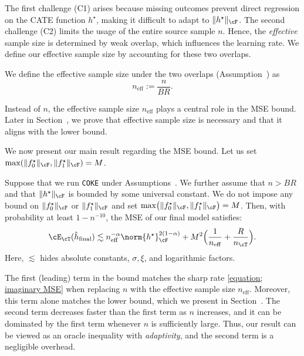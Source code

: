 \documentclass[12pt,a4paper,pdftex,onepage]{article}
\newcommand{\final}{\operatorname{final}}
\begin{document}
The first challenge (C1) arises because missing outcomes prevent direct regression on the CATE function \(h^\star\), making it difficult to adapt to \(\|h^\star\|_\cF\). 
The second challenge (C2) limits the usage of the entire source sample \(n\). 
Hence, the \emph{effective} sample size is determined by weak overlap, which influences the learning rate.
We define our effective sample size by accounting for these two overlaps. 
\begin{definition}
We define the effective sample size under the two overlaps (Assumption~) as 
\[
n_{\operatorname{eff}}:= \frac{n}{BR}.
\]
\end{definition}
Instead of \(n\), the effective sample size \(n_{\operatorname{eff}}\) plays a central role in the MSE bound.
Later in Section~, we prove that effective sample size is necessary and that it aligns with the lower bound.

We now present our main result regarding the MSE bound.
Let us set \(\max(\|f_0^\star \|_\cF,\|f_1^\star \|_\cF) = M\). 

\begin{theorem}\label{theorem; main theorem}
Suppose that we run \texttt{COKE} under Assumptions~. 
We further assume that \(n > BR\) and that \(\| h^\star\|_{\cF}\) is bounded by some universal constant. 
We do not impose any bound on \(\|f_0^\star\|_\cF\) or \(\|f_1^\star\|_\cF\) and set \(\max\bigl(\|f_0^\star\|_\cF,\|f_1^\star\|_\cF\bigr) = M\). 
Then, with probability at least \(1-n^{-10}\), the MSE of our final model satisfies:
\[
\cE_\cT(\hat{h}_{\final}) 
\lesssim n_{\operatorname{eff}}^{-\alpha} \norm{h^\star}^{2(1-\alpha)}_\cF + M^2 \Bigl(\frac{1}{n_{\operatorname{eff}}}+ \frac{R}{n_\cT}\Bigr).
\]
Here, \(\lesssim\) hides absolute constants, \(\sigma,\xi\), and logarithmic factors.
\end{theorem}

The first (leading) term in the bound matches the sharp rate \eqref{equation; imaginary MSE} when replacing \(n\) with the effective sample size \(n_{\operatorname{eff}}\). 
Moreover, this term alone matches the lower bound, which we present in Section~.
The second term decreases faster than the first term as \(n\) increases, and it can be dominated by the first term whenever \(n\) is sufficiently large.
Thus, our result can be viewed as an oracle inequality with \emph{adaptivity}, and the second term is a negligible overhead. 
\end{document}
